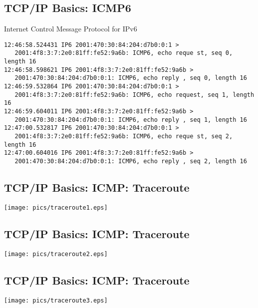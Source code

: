 \documentclass[xga]{xdvislides}
\begin{document}
\subsection{TCP/IP Basics: ICMP6}
\begin{center}
Internet Control Message Protocol for IPv6
\end{center}
\vspace{.2in}

\begin{verbatim}
12:46:58.524431 IP6 2001:470:30:84:204:d7b0:0:1 >
   2001:4f8:3:7:2e0:81ff:fe52:9a6b: ICMP6, echo reque st, seq 0, length 16
12:46:58.598621 IP6 2001:4f8:3:7:2e0:81ff:fe52:9a6b >
   2001:470:30:84:204:d7b0:0:1: ICMP6, echo reply , seq 0, length 16
12:46:59.532864 IP6 2001:470:30:84:204:d7b0:0:1 >
   2001:4f8:3:7:2e0:81ff:fe52:9a6b: ICMP6, echo request, seq 1, length 16
12:46:59.604011 IP6 2001:4f8:3:7:2e0:81ff:fe52:9a6b >
   2001:470:30:84:204:d7b0:0:1: ICMP6, echo reply , seq 1, length 16
12:47:00.532817 IP6 2001:470:30:84:204:d7b0:0:1 >
   2001:4f8:3:7:2e0:81ff:fe52:9a6b: ICMP6, echo reque st, seq 2, length 16
12:47:00.604016 IP6 2001:4f8:3:7:2e0:81ff:fe52:9a6b >
   2001:470:30:84:204:d7b0:0:1: ICMP6, echo reply , seq 2, length 16
\end{verbatim}

\subsection{TCP/IP Basics: ICMP: Traceroute}
\vspace*{\fill}
\begin{center}
	\texttt{[image: pics/traceroute1.eps]}
\end{center}
\vspace*{\fill}

\subsection{TCP/IP Basics: ICMP: Traceroute}
\vspace*{\fill}
\begin{center}
	\texttt{[image: pics/traceroute2.eps]}
\end{center}
\vspace*{\fill}

\subsection{TCP/IP Basics: ICMP: Traceroute}
\vspace*{\fill}
\begin{center}
	\texttt{[image: pics/traceroute3.eps]}
\end{center}
\vspace*{\fill}
\end{document}
